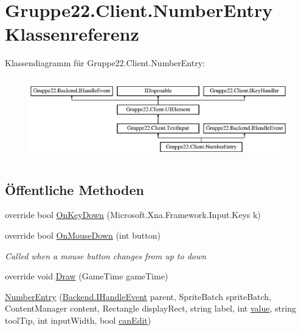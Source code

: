 \hypertarget{class_gruppe22_1_1_client_1_1_number_entry}{\section{Gruppe22.\-Client.\-Number\-Entry Klassenreferenz}
\label{class_gruppe22_1_1_client_1_1_number_entry}
}
Klassendiagramm für Gruppe22.\-Client.\-Number\-Entry\-:\begin{figure}[H]
\begin{center}
\leavevmode
\includegraphics[height=3.589744cm]{class_gruppe22_1_1_client_1_1_number_entry}
\end{center}
\end{figure}
\subsection*{Öffentliche Methoden}
\begin{DoxyCompactItemize}
\item 
override bool \hyperlink{class_gruppe22_1_1_client_1_1_number_entry_aa343011468244db0c7630ac020a701f5}{On\-Key\-Down} (Microsoft.\-Xna.\-Framework.\-Input.\-Keys k)
\item 
override bool \hyperlink{class_gruppe22_1_1_client_1_1_number_entry_afe70d1af7d72762dc877ead2de4489f6}{On\-Mouse\-Down} (int button)
\begin{DoxyCompactList}\small\item\em Called when a mouse button changes from up to down \end{DoxyCompactList}\item 
override void \hyperlink{class_gruppe22_1_1_client_1_1_number_entry_ad662c3ad36f43640e8c662fcc3223f74}{Draw} (Game\-Time game\-Time)
\item 
\hyperlink{class_gruppe22_1_1_client_1_1_number_entry_a1fc8e5ee8a323496a1ae837479da5254}{Number\-Entry} (\hyperlink{interface_gruppe22_1_1_backend_1_1_i_handle_event}{Backend.\-I\-Handle\-Event} parent, Sprite\-Batch sprite\-Batch, Content\-Manager content, Rectangle display\-Rect, string label, int \hyperlink{class_gruppe22_1_1_client_1_1_number_entry_a3164c478660266404474cd85491db5dc}{value}, string tool\-Tip, int input\-Width, bool \hyperlink{class_gruppe22_1_1_client_1_1_text_input_ae512171e8f7caead8c28eb9327ccbf40}{can\-Edit})
\end{DoxyCompactItemize}
